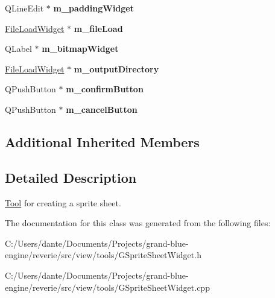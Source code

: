 \begin{Indent}
\begin{DoxyCompactItemize}
Q\+Line\+Edit $\ast$ {\bfseries m\+\_\+padding\+Widget}
\item 
\mbox{\label{classrev_1_1_view_1_1_sprite_sheet_widget_a109190ed063398588ee73f993f327b0a}} 
\mbox{\hyperlink{classrev_1_1_view_1_1_file_load_widget}{File\+Load\+Widget}} $\ast$ {\bfseries m\+\_\+file\+Load}
\item 
\mbox{\label{classrev_1_1_view_1_1_sprite_sheet_widget_a822ed11011cd63f0dc3463724d8c5673}} 
Q\+Label $\ast$ {\bfseries m\+\_\+bitmap\+Widget}
\item 
\mbox{\label{classrev_1_1_view_1_1_sprite_sheet_widget_a0a159823bd43ae6eb62a4b2fd09eb7a3}} 
\mbox{\hyperlink{classrev_1_1_view_1_1_file_load_widget}{File\+Load\+Widget}} $\ast$ {\bfseries m\+\_\+output\+Directory}
\item 
\mbox{\label{classrev_1_1_view_1_1_sprite_sheet_widget_a2dafdbdd3131d30b79248a52fb8ac7b8}} 
Q\+Push\+Button $\ast$ {\bfseries m\+\_\+confirm\+Button}
\item 
\mbox{\label{classrev_1_1_view_1_1_sprite_sheet_widget_ac9da86adcb011689d7f98eaac0aea969}} 
Q\+Push\+Button $\ast$ {\bfseries m\+\_\+cancel\+Button}
\end{DoxyCompactItemize}
\end{Indent}
\subsection*{Additional Inherited Members}


\subsection{Detailed Description}
\mbox{\hyperlink{classrev_1_1_view_1_1_tool}{Tool}} for creating a sprite sheet. 

The documentation for this class was generated from the following files\+:\begin{DoxyCompactItemize}
\item 
C\+:/\+Users/dante/\+Documents/\+Projects/grand-\/blue-\/engine/reverie/src/view/tools/G\+Sprite\+Sheet\+Widget.\+h\item 
C\+:/\+Users/dante/\+Documents/\+Projects/grand-\/blue-\/engine/reverie/src/view/tools/G\+Sprite\+Sheet\+Widget.\+cpp\end{DoxyCompactItemize}
